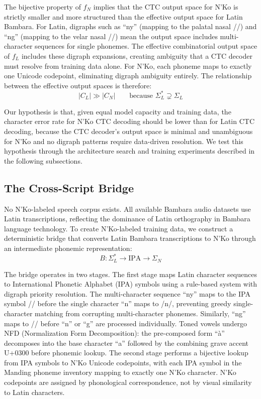 \documentclass[11pt]{article}
\newcommand{\nko}{N'Ko}
\begin{document}
The bijective property of $f_N$ implies that the CTC output space for \nko{} is strictly smaller and more structured than the effective output space for Latin Bambara. For Latin, digraphs such as ``ny'' (mapping to the palatal nasal //) and ``ng'' (mapping to the velar nasal //) mean the output space includes multi-character sequences for single phonemes. The effective combinatorial output space of $f_L$ includes these digraph expansions, creating ambiguity that a CTC decoder must resolve from training data alone. For \nko{}, each phoneme maps to exactly one Unicode codepoint, eliminating digraph ambiguity entirely. The relationship between the effective output spaces is therefore:
\begin{equation}
|C_L| \gg |C_N| \qquad \text{because } \Sigma_L^* \supsetneq \Sigma_L
\label{eq:output_space}
\end{equation}

Our hypothesis is that, given equal model capacity and training data, the character error rate for \nko{} CTC decoding should be lower than for Latin CTC decoding, because the CTC decoder's output space is minimal and unambiguous for \nko{} and no digraph patterns require data-driven resolution. We test this hypothesis through the architecture search and training experiments described in the following subsections.

\subsection{The Cross-Script Bridge}
\label{sec:bridge}

No \nko{}-labeled speech corpus exists. All available Bambara audio datasets use Latin transcriptions, reflecting the dominance of Latin orthography in Bambara language technology. To create \nko{}-labeled training data, we construct a deterministic bridge that converts Latin Bambara transcriptions to \nko{} through an intermediate phonemic representation:
\begin{equation}
B: \Sigma_L^* \to \text{IPA} \to \Sigma_N
\label{eq:bridge}
\end{equation}

The bridge operates in two stages. The first stage maps Latin character sequences to International Phonetic Alphabet (IPA) symbols using a rule-based system with digraph priority resolution. The multi-character sequence ``ny'' maps to the IPA symbol // before the single character ``n'' maps to /n/, preventing greedy single-character matching from corrupting multi-character phonemes. Similarly, ``ng'' maps to // before ``n'' or ``g'' are processed individually. Toned vowels undergo NFD (Normalization Form Decomposition): the pre-composed form ``\`a'' decomposes into the base character ``a'' followed by the combining grave accent U+0300 before phonemic lookup. The second stage performs a bijective lookup from IPA symbols to \nko{} Unicode codepoints, with each IPA symbol in the Manding phoneme inventory mapping to exactly one \nko{} character. \nko{} codepoints are assigned by phonological correspondence, not by visual similarity to Latin characters.
\end{document}
